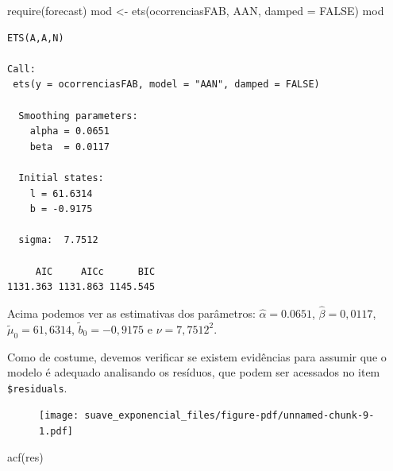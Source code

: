 \documentclass[
  letterpaper,
  DIV=11,
  numbers=noendperiod]{scrreprt}
\newenvironment{Shaded}{\begin{snugshade}}{\end{snugshade}}
\newcommand{\AttributeTok}[1]{\textcolor[rgb]{0.40,0.45,0.13}{#1}}
\newcommand{\ConstantTok}[1]{\textcolor[rgb]{0.56,0.35,0.01}{#1}}
\newcommand{\FunctionTok}[1]{\textcolor[rgb]{0.28,0.35,0.67}{#1}}
\newcommand{\NormalTok}[1]{\textcolor[rgb]{0.00,0.23,0.31}{#1}}
\newcommand{\OtherTok}[1]{\textcolor[rgb]{0.00,0.23,0.31}{#1}}
\newcommand{\SpecialCharTok}[1]{\textcolor[rgb]{0.37,0.37,0.37}{#1}}
\newcommand{\StringTok}[1]{\textcolor[rgb]{0.13,0.47,0.30}{#1}}
\theoremstyle{definition}
\theoremstyle{plain}
\theoremstyle{definition}
\theoremstyle{plain}
\theoremstyle{remark}
\begin{document}
\begin{Shaded}
\begin{Highlighting}[]
\FunctionTok{require}\NormalTok{(forecast)}
\NormalTok{mod }\OtherTok{\textless{}{-}} \FunctionTok{ets}\NormalTok{(ocorrenciasFAB, }\StringTok{\textquotesingle{}AAN\textquotesingle{}}\NormalTok{, }\AttributeTok{damped =} \ConstantTok{FALSE}\NormalTok{)}
\NormalTok{mod}
\end{Highlighting}
\end{Shaded}

\begin{verbatim}
ETS(A,A,N) 

Call:
 ets(y = ocorrenciasFAB, model = "AAN", damped = FALSE) 

  Smoothing parameters:
    alpha = 0.0651 
    beta  = 0.0117 

  Initial states:
    l = 61.6314 
    b = -0.9175 

  sigma:  7.7512

     AIC     AICc      BIC 
1131.363 1131.863 1145.545 
\end{verbatim}

Acima podemos ver as estimativas dos parâmetros:
\(\hat{\alpha}=0.0651\), \(\hat{\beta}=0,0117\),
\(\tilde{\mu}_0=61,6314\), \(\tilde{b}_0=-0,9175\) e \(\nu=7,7512^2\).

Como de costume, devemos verificar se existem evidências para assumir
que o modelo é adequado analisando os resíduos, que podem ser acessados
no item \texttt{\$residuals}.

\begin{Shaded}
\end{Shaded}

\begin{figure}[H]

{\centering \texttt{[image: suave\_exponencial\_files/figure-pdf/unnamed-chunk-9-1.pdf]}

}

\end{figure}

\begin{Shaded}
\begin{Highlighting}[]
\FunctionTok{acf}\NormalTok{(res)}
\end{Highlighting}
\end{Shaded}
\end{document}
